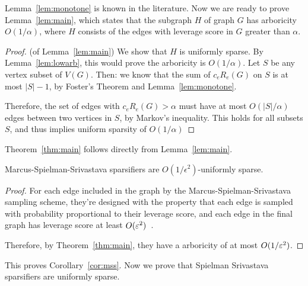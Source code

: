 Lemma~\ref{lem:monotone} is known in the literature.
% 
% 
% 
Now we are ready to prove Lemma~\ref{lem:main}, which states that the subgraph
$H$ of graph $G$ has arboricity $O(1/\alpha)$, where $H$ consists of the edges with leverage score in
$G$ greater than $\alpha$.
\begin{proof} (of Lemma~\ref{lem:main})
  We show that $H$ is uniformly sparse.  By Lemma~\ref{lem:lowarb}, this would prove the
  arboricity is $O(1/ \alpha)$.
  Let $S$ be any vertex subset of $V(G)$. Then: we know that the sum of
  $c_e R_e(G)$ on $S$ is at most $|S|-1$, by Foster's Theorem and
  Lemma~\ref{lem:monotone}.

  Therefore,  the set of edges with $c_e R_e(G) > \alpha$ must have at
  most $O(|S|/\alpha)$ edges between two vertices in $S$, by
  Markov's inequality.  This holds for all subsets $S$, and thus implies
  uniform sparsity of $O(1/\alpha)$
\end{proof}
Theorem~\ref{thm:main} follows directly from Lemma~\ref{lem:main}.

\begin{theorem}
Marcus-Spielman-Srivastava sparsifiers are $O(1/\epsilon^2)$-uniformly sparse.
\end{theorem}

\begin{proof} 
For each edge included in the graph by the Marcus-Spielman-Srivastava
sampling scheme, they're designed with the property that each edge is
sampled with probability proportional to their leverage score, and each
edge in the final graph has leverage score at least
$O(\varepsilon^2)$~\cite{Srivastava13, MarcusSS13}.

Therefore, by Theorem~\ref{thm:main}, they have a arboricity of at most $O(1/\varepsilon^2)$.
\end{proof}
This proves Corollary~\ref{cor:mss}. Now we prove that Spielman
Srivastava sparsifiers are uniformly sparse.

